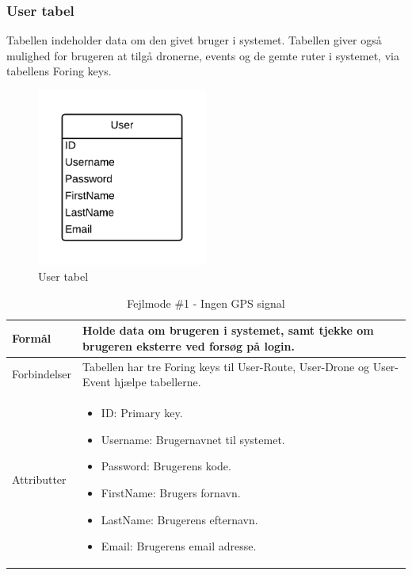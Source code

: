 \subsubsection{User tabel}
Tabellen indeholder data om den givet bruger i systemet. Tabellen giver også mulighed for brugeren at tilgå dronerne, events og de gemte ruter i systemet, via tabellens Foring keys.
\vspace{-5pt}
\begin{figure}[H]
	\centering
	\includegraphics[width=0.5\textwidth]{Billeder/database/UserTabel.png}
	\vspace{-5pt}
	\caption{User tabel}
	\label{fig:user_tabel}
\end{figure}

\begin{table}[H]
\begin{tabular}{| p{3cm}| p{11.5cm}|}
\hline

Formål	 							& Holde data om brugeren i systemet, samt tjekke om brugeren eksterre ved forsøg på login.\\\hline
Forbindelser						& Tabellen har tre Foring keys til User-Route, User-Drone og User-Event hjælpe tabellerne.\\\hline
Attributter						& \begin{itemize}
												\item ID: Primary key.
												\item Username: Brugernavnet til systemet.
												\item Password: Brugerens kode.
												\item FirstName: Brugers fornavn.
												\item LastName: Brugerens efternavn.
												\item Email: Brugerens email adresse.
											\end{itemize} \\\hline 
\end{tabular}
\caption{Fejlmode \#1 - Ingen GPS signal}
\label{tab:fejlmode1}
\end{table}